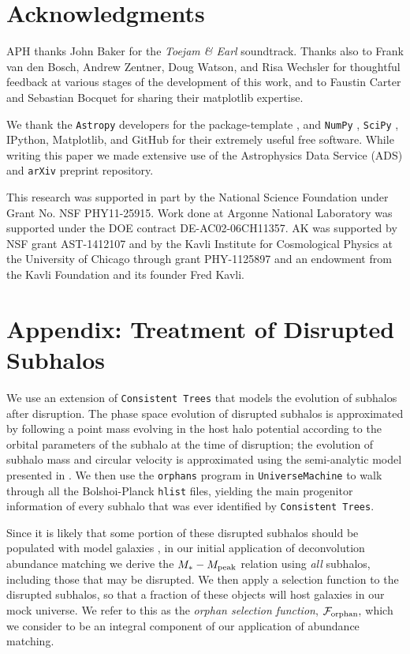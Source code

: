 \documentclass[usenatbib,usegraphicx,letterpaper]{mn2e}
\newcommand{\mstar}{M_{\ast}}
\newcommand{\mpeak}{M_{\rm peak}}
\begin{document}
\section*{Acknowledgments}

APH thanks John Baker for the {\em Toejam \& Earl} soundtrack. Thanks also to Frank van den Bosch, Andrew Zentner, Doug Watson, and Risa Wechsler for thoughtful feedback at various stages of the development of this work, and to Faustin Carter and Sebastian Bocquet for sharing their matplotlib expertise.

We thank the {\tt Astropy} developers for the package-template \citep{astropy}, and {\tt NumPy} \citep{numpy_ndarray}, {\tt SciPy} \citep{scipy}, IPython, Matplotlib, and GitHub for their extremely useful free software. While writing this paper we made extensive use of the Astrophysics Data Service (ADS) and {\tt arXiv} preprint repository.

This research was supported in part by the National Science Foundation under Grant No. NSF PHY11-25915. Work done at Argonne National Laboratory was supported under the DOE contract DE-AC02-06CH11357. AK was  supported by NSF grant  AST-1412107 and by the Kavli Institute for Cosmological Physics at the University of Chicago through grant PHY-1125897 and an endowment from the Kavli Foundation and its founder Fred Kavli.



\section*{Appendix: Treatment of Disrupted Subhalos}

We use an extension of {\tt Consistent Trees} that models the evolution of subhalos after disruption. The phase space evolution of disrupted subhalos is approximated by following a point mass evolving in the host halo potential according to the orbital parameters of the subhalo at the time of disruption; the evolution of subhalo mass and circular velocity is approximated using the semi-analytic model presented in \citet{jiang_vdB14}. We then use the {\tt orphans} program in {\tt UniverseMachine} to walk through all the Bolshoi-Planck {\tt hlist} files, yielding the main progenitor information of every subhalo that was ever identified by {\tt Consistent Trees}.

Since it is likely that some portion of these disrupted subhalos should be populated with model galaxies \citep{guo_white13, campbell_etal17}, in our initial application of deconvolution abundance matching we derive the $\mstar-\mpeak$ relation using {\em all} subhalos, including those that may be disrupted. We then apply a selection function to the disrupted subhalos, so that a fraction of these objects will host galaxies in our mock universe. We refer to this as the {\em orphan selection function}, $\mathcal{F}_{\rm orphan},$ which we consider to be an integral component of our application of abundance matching.
\end{document}
